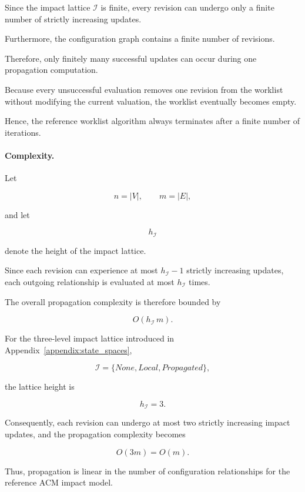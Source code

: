 \documentclass[10pt]{article}
\begin{document}
Since the impact lattice
$\mathcal I$
is finite, every revision can undergo only a finite number of strictly
increasing updates.

Furthermore, the configuration graph contains a finite number of revisions.

Therefore, only finitely many successful updates can occur during one
propagation computation.

Because every unsuccessful evaluation removes one revision from the worklist
without modifying the current valuation, the worklist eventually becomes empty.

Hence, the reference worklist algorithm always terminates after a finite number
of iterations.

\paragraph{Complexity.}

Let

\[
n
=
|V|,
\qquad
m
=
|E|,
\]

and let

\[
h_{\mathcal I}
\]

denote the height of the impact lattice.

Since each revision can experience at most
$h_{\mathcal I}-1$
strictly increasing updates, each outgoing relationship is evaluated at most
$h_{\mathcal I}$
times.

The overall propagation complexity is therefore bounded by

\begin{equation}
	\label{eq:worklist_complexity_final}
	O
	\!\left(
	h_{\mathcal I}
	\,m
	\right).
\end{equation}

For the three-level impact lattice introduced in
Appendix~\ref{appendix:state_spaces},

\[
\mathcal I
=
\{
None,
Local,
Propagated
\},
\]

the lattice height is

\[
h_{\mathcal I}=3.
\]

Consequently, each revision can undergo at most two strictly increasing impact
updates, and the propagation complexity becomes

\begin{equation}
	\label{eq:worklist_complexity_acm}
	O(3m)
	=
	O(m).
\end{equation}

Thus, propagation is linear in the number of configuration relationships for
the reference ACM impact model.
\end{document}
